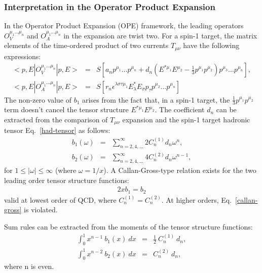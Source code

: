 % 
\subsubsection{Interpretation in the Operator Product Expansion}
%
In the Operator Product Expansion (OPE) framework, the leading operators 
$O_V^{\mu_1...\mu_n}$ and $O_A^{\mu_1...\mu_n}$ in the expansion are twist two. For a 
spin-1 target, the matrix elements of the time-ordered product of two currents 
$T_{\mu\nu}$ have the following expressions:
%
\begin{eqnarray}
<p,E|O_V^{\mu_1...\mu_n}|p,E>&=&S[a_np^{\mu_1}...p^{\mu_n}+d_n(E^{*\mu_1}E^{\mu_2}-\frac{1}{3}p^{\mu_1}
p^{\mu_2})p^{\mu_3}...p^{\mu_n}], \nonumber \\
<p,E|O_A^{\mu_1...\mu_n}|p,E>&=&S[r_n\epsilon^{\lambda\sigma\tau\mu_1}E_{\lambda}^*E_{\sigma}p_{\tau}
p^{\mu_2}...p^{\mu_n}]
\label{matrix-elt}
\end{eqnarray}
%
The non-zero value of $b_1$ arises from the fact that, in a spin-1 target, the 
$\frac{1}{3}p^{\mu_1}p^{\mu_2}$ term doesn't cancel the tensor structure $E^{*\mu_1}E^{\mu_2}$. 
The coefficient $d_n$ can be extracted from the comparison of $T_{\mu\nu}$ expansion 
and the spin-1 target hadronic tensor Eq.~\ref{had-tensor} as follows:
%
\begin{eqnarray}
b_1(\omega)&=&\sum_{n=2,4,...}^\infty 2 C_n^{(1)} d_n \omega^n, \nonumber \\
b_2(\omega)&=&\sum_{n=2,4,...}^\infty 4 C_n^{(2)} d_n \omega^{n-1},
\end{eqnarray}
%
for $1 \le |\omega| \le \infty$ (where $\omega = 1/x$). A Callan-Gross-type relation 
exists for the two leading order tensor structure functions:
%
\begin{eqnarray}
 2 x b_1 = b_2
\label{callan-gross}
\end{eqnarray}
%
valid at lowest order of QCD, where $C_n^{(1)} = C_n^{(2)}$.
At higher orders, Eq.~\ref{callan-gross} is violated.

Sum rules can be 
extracted from the moments of the tensor structure functions:
%
\begin{eqnarray}
\int_0^1 x^{n-1}~b_1(x)~dx &=& \frac{1}{2}~C_n^{(1)}~d_n, \nonumber \\
\int_0^1 x^{n-2}~b_2(x)~dx &=& C_n^{(2)}~d_n,
\label{sr}
\end{eqnarray}
%
where n is even. 

